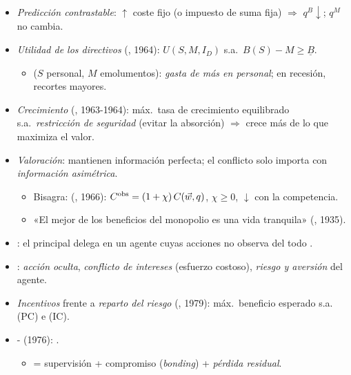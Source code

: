 \documentclass{article}
\begin{document}
\begin{columnas}
\begin{itemize}
\item \emph{Predicción contrastable}: $\uparrow$ coste fijo (o impuesto de suma fija) $\Rightarrow$ $q^B\downarrow$; $q^M$ no cambia.
\end{itemize}
\begin{itemize}
\item \emph{Utilidad de los directivos} (, 1964): $U(S,M,I_D)$ s.a.\ $B(S)-M\geq\underline{B}$.
  \begin{itemize}
  \item ($S$ personal, $M$ emolumentos): \emph{gasta de más en personal}; en recesión, recortes mayores.
  \end{itemize}
\item \emph{Crecimiento} (, 1963-1964): máx.\ tasa de crecimiento equilibrado s.a.\ \emph{restricción de seguridad} (evitar la absorción) $\Rightarrow$ crece más de lo que maximiza el valor.
\item \emph{Valoración}: mantienen información perfecta; el conflicto solo importa con \emph{información asimétrica}.
  \begin{itemize}
  \item Bisagra:  (, 1966): $C^{\mathrm{obs}}=(1+\chi)\,C(\vec{w},q)$, $\chi\geq0$, $\downarrow$ con la competencia.
  \item «El mejor de los beneficios del monopolio es una vida tranquila» (, 1935).
  \end{itemize}
\end{itemize}
\begin{itemize}
\item {}: el principal delega en un agente cuyas acciones no observa del todo .
\item {}: \emph{acción oculta}, \emph{conflicto de intereses} (esfuerzo costoso), \emph{riesgo y aversión} del agente.
\item \emph{Incentivos} frente a \emph{reparto del riesgo} (, 1979): máx.\ beneficio esperado s.a.\  (PC) e  (IC).
\item {}- (1976): .
  \begin{itemize}
  \item {} = supervisión + compromiso (\emph{bonding}) + \emph{pérdida residual}.

\end{itemize}
\end{itemize}
\end{columnas}
\end{document}
